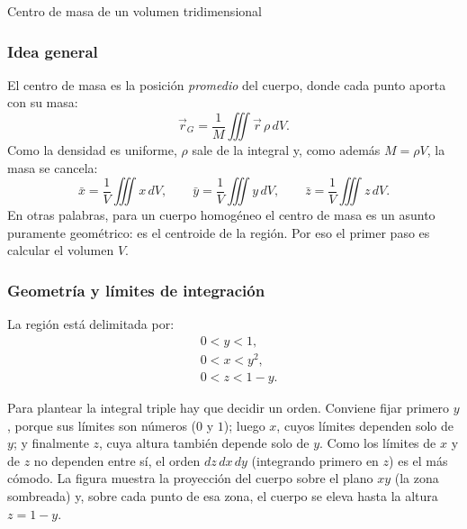 \begin{solucion}{Centro de masa de un volumen tridimensional}

\subsubsection*{Idea general}

El centro de masa es la posición \emph{promedio} del cuerpo, donde cada punto aporta con su masa:
\[
\vec r_G=\frac{1}{M}\iiint \vec r\,\rho\,dV .
\]
Como la densidad es uniforme, $\rho$ sale de la integral y, como además $M=\rho V$, la masa se cancela:
\[
\bar x=\frac{1}{V}\iiint x\,dV,\qquad
\bar y=\frac{1}{V}\iiint y\,dV,\qquad
\bar z=\frac{1}{V}\iiint z\,dV .
\]
En otras palabras, para un cuerpo homogéneo el centro de masa es un asunto puramente geométrico: es el centroide de la región. Por eso el primer paso es calcular el volumen $V$.

\subsubsection*{Geometría y límites de integración}

La región está delimitada por:
\begin{align*}
& 0 < y < 1, \\
& 0 < x < y^2, \\
& 0 < z < 1 - y.
\end{align*}

Para plantear la integral triple hay que decidir un orden. Conviene fijar primero $y$, porque sus límites son números ($0$ y $1$); luego $x$, cuyos límites dependen solo de $y$; y finalmente $z$, cuya altura también depende solo de $y$. Como los límites de $x$ y de $z$ no dependen entre sí, el orden $dz\,dx\,dy$ (integrando primero en $z$) es el más cómodo. La figura muestra la proyección del cuerpo sobre el plano $xy$ (la zona sombreada) y, sobre cada punto de esa zona, el cuerpo se eleva hasta la altura $z=1-y$.

\begin{center}
\end{center}


\end{solucion}
